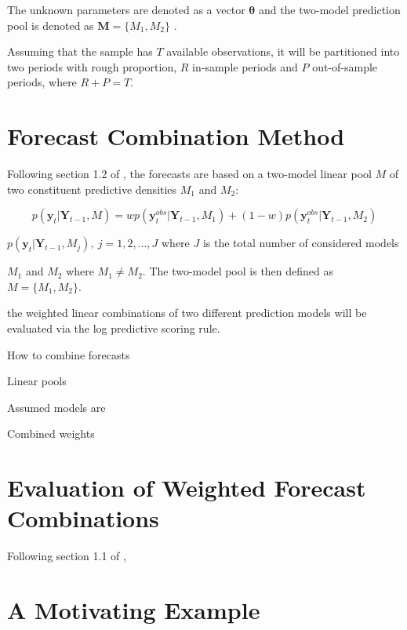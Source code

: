 \documentclass{monashthesis}
\begin{document}
The unknown parameters are denoted as a vector \(\pmb{\theta}\) and the two-model prediction pool is denoted as \(\pmb{M}=\{M_1, M_2\}\) .

Assuming that the sample has \(T\) available observations, it will be partitioned into two periods with rough proportion, \(R\) in-sample periods and \(P\) out-of-sample periods, where \(R+P=T\).

\hypertarget{forecast-combination-method}{%
\section{Forecast Combination Method}\label{forecast-combination-method}}

Following section 1.2 of \textcite{GA11}, the forecasts are based on a two-model linear pool \(M\) of two constituent predictive densities \(M_1\) and \(M_2\):

\begin{equation}
p(\pmb{y}_t|\pmb{Y}_{t-1},M) = wp(\pmb{y}^{obs}_t|\pmb{Y}_{t-1},M_1) + (1-w)p(\pmb{y}^{obs}_t|\pmb{Y}_{t-1},M_2)
\end{equation}

\(p(\pmb{y}_t|\pmb{Y}_{t-1},M_j), \ j=1,2,...,J\) where \(J\) is the total number of considered models

\(M_1\) and \(M_2\) where \(M_1\ne M_2\). The two-model pool is then defined as \(M=\{M_1, M_2\}\).

the weighted linear combinations of two different prediction models will be evaluated via the log predictive scoring rule.

How to combine forecasts

Linear pools

Assumed models are

Combined weights

\hypertarget{evaluation-of-weighted-forecast-combinations}{%
\section{Evaluation of Weighted Forecast Combinations}\label{evaluation-of-weighted-forecast-combinations}}

Following section 1.1 of \textcite{GA11},

\hypertarget{a-motivating-example}{%
\section{A Motivating Example}\label{a-motivating-example}}
\end{document}
